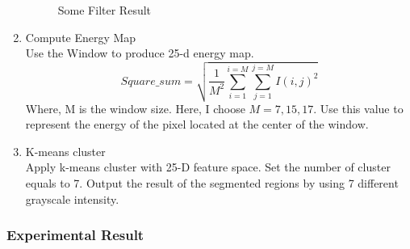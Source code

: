 \documentclass[11pt]{article}
\begin{document}
\begin{enumerate}
\begin{figure}[!htbp]
{	}
	 \qquad
	 
	\caption{Some Filter Result} 
	\label{lawsfiltered}  
\end{figure}

	
	
\item Compute Energy Map\\
Use the Window to produce 25-d energy map.
\begin{equation}
Square\_ sum=\sqrt { \frac { 1 }{ M^2 } \sum _{ i=1 }^{ i=M }{ \sum _{ j=1 }^{ j=M }{ { I(i,j) }^{ 2 } }  }  } 
\end{equation}
Where, M is the window size. Here, I choose $M = 7,15,17$. Use this value to represent the energy of the pixel located at the center of the window.
\item K-means cluster \\
Apply k-means cluster with 25-D feature space. Set the number of cluster equals to 7. Output the result of the segmented regions by using 7 different grayscale intensity.
\end{enumerate} 
\subsubsection{Experimental Result}
\end{document}
